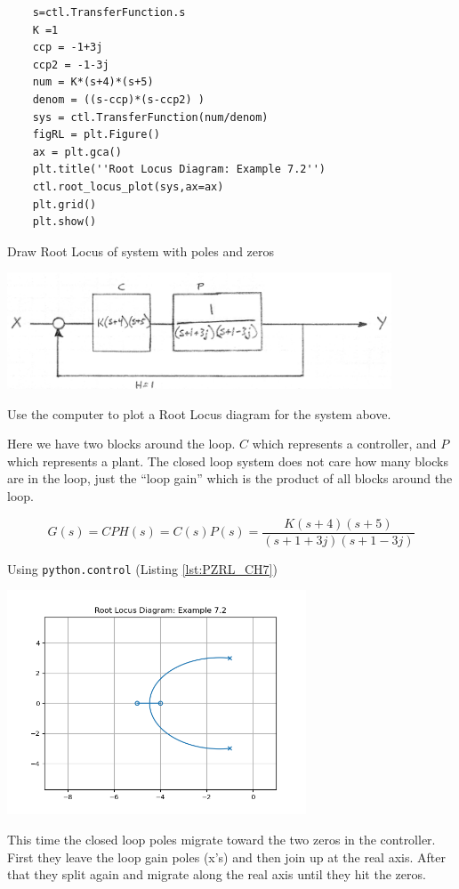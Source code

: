 \vspace{0.75in}

\begin{listing}
  \begin{verbatim}
    s=ctl.TransferFunction.s
    K =1
    ccp = -1+3j
    ccp2 = -1-3j
    num = K*(s+4)*(s+5)
    denom = ((s-ccp)*(s-ccp2) )
    sys = ctl.TransferFunction(num/denom)
    figRL = plt.Figure()
    ax = plt.gca()
    plt.title(''Root Locus Diagram: Example 7.2'')
    ctl.root_locus_plot(sys,ax=ax)
    plt.grid()
    plt.show()
  \end{verbatim}
  \caption{Draw Root Locus of system with poles and zeros}
  \label{lst:PZRL_CH7}
\end{listing}

\begin{ExampleSmall}\label{contplantrootlocus}


\includegraphics[width=4.5in]{figs07/00780a.png}


Use the computer to plot a Root Locus diagram for the system above.

Here we have two blocks around the loop.  $C$ which represents a controller, and $P$ which represents a plant.  The closed loop system does not care how many blocks are in the loop, just the ``loop gain'' which is the product of all blocks around the loop.

\[
G(s) = CPH(s) = C(s)P(s) = \frac {K(s+4)(s+5)}   {(s+1+3j)(s+1-3j)}
\]

\vspace{0.25in}
Using {\tt python.control} (Listing \ref{lst:PZRL_CH7})



\includegraphics[width=3.5in]{figs07/B26H83.png}

This time the closed loop poles migrate toward the two zeros in the controller.  First they leave the loop gain poles (x's) and then join up at the real axis. After that  they split again and migrate along the real axis until they hit the zeros.
\end{ExampleSmall}
